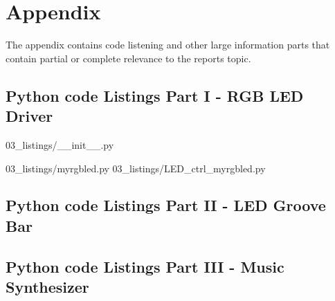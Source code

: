 \section{Appendix} \label{sec: Appendix}
The appendix contains code listening and other large information parts that contain partial or complete relevance to the reports topic. 

\subsection{Python code Listings Part I - RGB LED Driver} \label{subsec: Python code Listings Part I}
 {03_listings/__init__.py }

 {03_listings/myrgbled.py }
 {03_listings/LED_ctrl_myrgbled.py }
\subsection{Python code Listings Part II - LED Groove Bar} \label{subsec: Python code Listings Part II}

\subsection{Python code Listings Part III - Music Synthesizer} \label{subsec: Python code Listings Part III}


